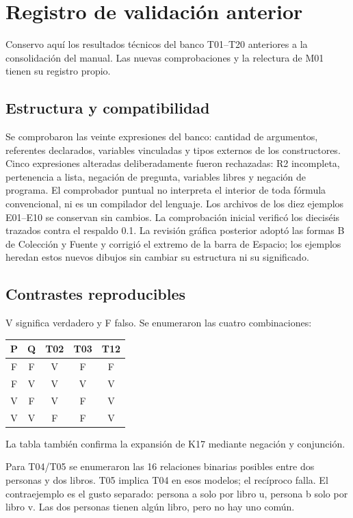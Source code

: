 \section{Registro de validación anterior}
Conservo aquí los resultados técnicos del banco T01--T20 anteriores a la consolidación del manual.
Las nuevas comprobaciones y la relectura de M01 tienen su registro propio.
\subsection{Estructura y compatibilidad}
Se comprobaron las veinte expresiones del banco: cantidad de argumentos,
referentes declarados, variables vinculadas y tipos externos de los constructores.
Cinco expresiones alteradas deliberadamente fueron rechazadas: R2 incompleta,
pertenencia a lista, negación de pregunta, variables libres y negación de programa.
El comprobador puntual no interpreta el interior de toda fórmula convencional,
ni es un compilador del lenguaje. Los archivos de los diez ejemplos E01--E10
se conservan sin cambios. La comprobación inicial verificó los dieciséis trazados
contra el respaldo 0.1. La revisión gráfica posterior adoptó las formas B de
Colección y Fuente y corrigió el extremo de la barra de Espacio; los ejemplos
heredan estos nuevos dibujos sin cambiar su estructura ni su significado.

\subsection{Contrastes reproducibles}
V significa verdadero y F falso. Se enumeraron las cuatro combinaciones:
\begin{center}\begin{tabular}{ccccc}
\toprule P & Q & T02 & T03 & T12 \\ \midrule
F & F & V & F & F \\
F & V & V & V & V \\
V & F & V & F & V \\
V & V & F & F & V \\ \bottomrule
\end{tabular}\end{center}
La tabla también confirma la expansión de K17 mediante negación y conjunción.

Para T04/T05 se enumeraron las 16 relaciones binarias posibles entre dos personas
y dos libros. T05 implica T04 en esos modelos; el recíproco falla. El contraejemplo
es el gusto separado: persona a solo por libro u, persona b solo por libro v.
Las dos personas tienen algún libro, pero no hay uno común.

